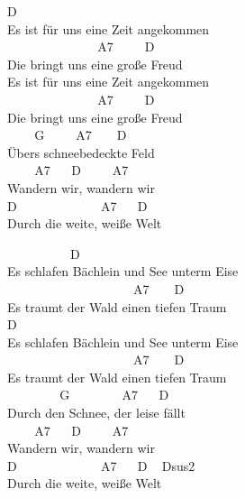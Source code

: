 \documentclass[
  letterpaper,
]{scrbook}
\begin{document}
D\\
Es ist für uns eine Zeit angekommen\\
\hspace*{0.333em} ~ ~ ~ ~ ~ ~ ~ ~ ~A7 ~ ~ ~D\\
Die bringt uns eine große Freud\\
Es ist für uns eine Zeit angekommen\\
\hspace*{0.333em} ~ ~ ~ ~ ~ ~ ~ ~ ~A7 ~ ~ ~D\\
Die bringt uns eine große Freud\\
\hspace*{0.333em} ~ ~ ~G ~ ~ ~A7 ~ ~ D\\
Übers schneebedeckte Feld\\
\hspace*{0.333em} ~ ~ ~A7 ~ ~D ~ ~ ~A7\\
Wandern wir, wandern wir\\
D ~ ~ ~ ~ ~ ~ ~ ~A7 ~ ~D\\
Durch die weite, weiße Welt

~ ~ ~ ~ ~ ~ D\\
Es schlafen Bächlein und See unterm Eise\\
\hspace*{0.333em} ~ ~ ~ ~ ~ ~ ~ ~ ~ ~ ~ ~ A7 ~ ~ D\\
Es traumt der Wald einen tiefen Traum\\
D\\
Es schlafen Bächlein und See unterm Eise\\
\hspace*{0.333em} ~ ~ ~ ~ ~ ~ ~ ~ ~ ~ ~ ~ A7 ~ ~ D\\
Es traumt der Wald einen tiefen Traum\\
\hspace*{0.333em} ~ ~ ~ ~ ~ G ~ ~ ~ ~ ~A7 ~ ~D\\
Durch den Schnee, der leise fällt\\
\hspace*{0.333em} ~ ~ ~A7 ~ ~D ~ ~ ~A7\\
Wandern wir, wandern wir\\
D ~ ~ ~ ~ ~ ~ ~ ~A7 ~ ~D ~ Dsus2\\
Durch die weite, weiße Welt
\end{document}
